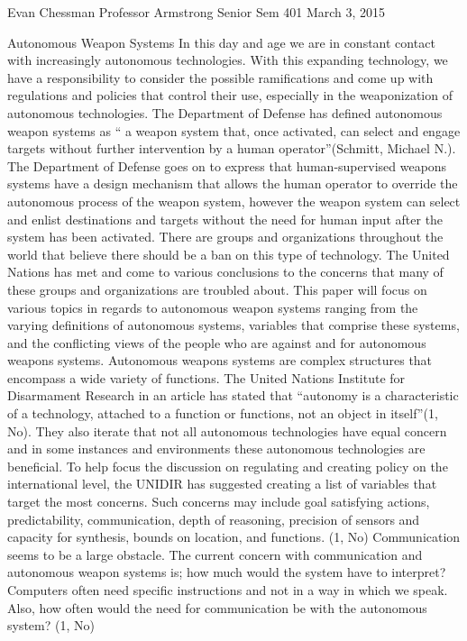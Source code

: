 Evan Chessman
Professor Armstrong
Senior Sem 401
March 3, 2015
 
Autonomous Weapon Systems
In this day and age we are in constant contact with increasingly autonomous technologies. With this expanding technology, we have a responsibility to consider the possible ramifications and come up with regulations and policies that control their use, especially in the weaponization of autonomous technologies. The Department of Defense has defined autonomous weapon systems as “ a weapon system that, once activated, can select and engage targets without further intervention by a human operator”(Schmitt, Michael N.). The Department of Defense goes on to express that human-supervised weapons systems have a design mechanism that allows the human operator to override the autonomous process of the weapon system, however the weapon system can select and enlist destinations and targets without the need for human input after the system has been activated. There are groups and organizations throughout the world that believe there should be a ban on this type of technology. The United Nations has met and come to various conclusions to the concerns that many of these groups and organizations are troubled about. This paper will focus on various topics in regards to autonomous weapon systems ranging from the varying definitions of autonomous systems, variables that comprise these systems, and the conflicting views of the people who are against and for autonomous weapons systems.
Autonomous weapons systems are complex structures that encompass a wide variety of functions. The United Nations Institute for Disarmament Research in an article has stated that “autonomy is a characteristic of a technology, attached to a function or functions, not an object in itself”(1, No). They also iterate that not all autonomous technologies have equal concern and in some instances and environments these autonomous technologies are beneficial. To help focus the discussion on regulating and creating policy on the international level, the UNIDIR has suggested creating a list of variables that target the most concerns. Such concerns may include goal satisfying actions, predictability, communication, depth of reasoning, precision of sensors and capacity for synthesis, bounds on location, and functions. (1, No)
Communication seems to be a large obstacle. The current concern with communication and autonomous weapon systems is; how much would the system have to interpret? Computers often need specific instructions and not in a way in which we speak. Also, how often would the need for communication be with the autonomous system? (1, No)
